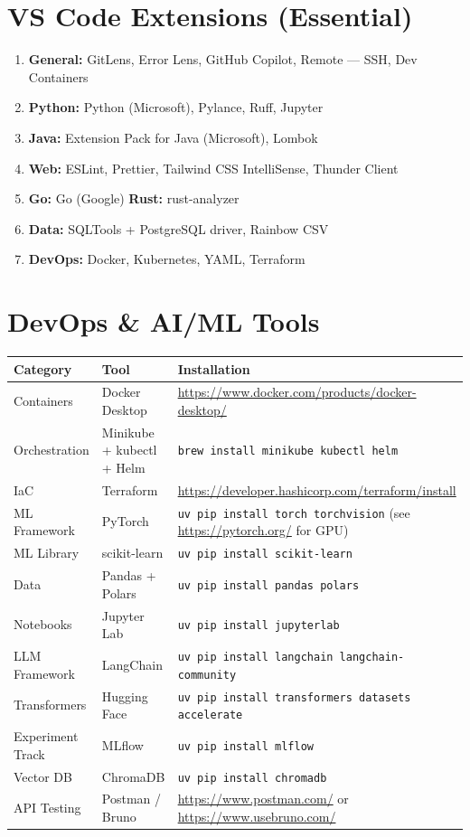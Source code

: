 \documentclass[11pt, a4paper, oneside]{report}
\begin{document}
{{{{\section[VS Code Extensions]{VS Code Extensions (Essential)}

\begin{enumerate}[leftmargin=*]
\item \textbf{General:} GitLens, Error Lens, GitHub Copilot, Remote --- SSH, Dev Containers
\item \textbf{Python:} Python (Microsoft), Pylance, Ruff, Jupyter
\item \textbf{Java:} Extension Pack for Java (Microsoft), Lombok
\item \textbf{Web:} ESLint, Prettier, Tailwind CSS IntelliSense, Thunder Client
\item \textbf{Go:} Go (Google) \quad\textbf{Rust:} rust-analyzer
\item \textbf{Data:} SQLTools + PostgreSQL driver, Rainbow CSV
\item \textbf{DevOps:} Docker, Kubernetes, YAML, Terraform
\end{enumerate}

\section[DevOps \& AI/ML]{DevOps \& AI/ML Tools}

{\small
\begin{longtable}{L{0.15\textwidth} L{0.22\textwidth} L{0.50\textwidth}}
\toprule
\textbf{Category} & \textbf{Tool} & \textbf{Installation} \\
\midrule
\endfirsthead
\bottomrule
\endlastfoot
Containers & Docker Desktop & \url{https://www.docker.com/products/docker-desktop/} \\
Orchestration & Minikube + kubectl + Helm & \texttt{brew install minikube kubectl helm} \\
IaC & Terraform & \url{https://developer.hashicorp.com/terraform/install} \\
ML Framework & PyTorch & \texttt{uv pip install torch torchvision} (see \url{https://pytorch.org/} for GPU) \\
ML Library & scikit-learn & \texttt{uv pip install scikit-learn} \\
Data & Pandas + Polars & \texttt{uv pip install pandas polars} \\
Notebooks & Jupyter Lab & \texttt{uv pip install jupyterlab} \\
LLM Framework & LangChain & \texttt{uv pip install langchain langchain-community} \\
Transformers & Hugging Face & \texttt{uv pip install transformers datasets accelerate} \\
Experiment Track & MLflow & \texttt{uv pip install mlflow} \\
Vector DB & ChromaDB & \texttt{uv pip install chromadb} \\
API Testing & Postman / Bruno & \url{https://www.postman.com/} or \url{https://www.usebruno.com/} \\
\end{longtable}

}}}}}
\end{document}
